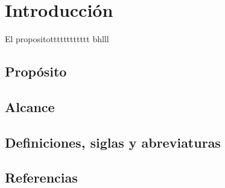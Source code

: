 \chapter{Introducción}
El propositotttttttttttt
bhlll
\section{Propósito}

\section{Alcance}

\section{Definiciones, siglas y abreviaturas}

\section{Referencias}